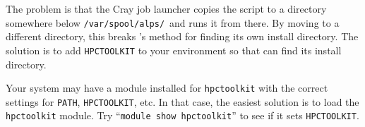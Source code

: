 The problem is that the Cray job launcher copies the \hpcrun{}
script to a directory somewhere below \verb|/var/spool/alps/|\ and runs
it from there.  By moving \hpcrun{} to a different directory, this
breaks \hpcrun{}'s method for finding its own install directory.
The solution is to add \verb|HPCTOOLKIT| to your environment so that
\hpcrun{} can find its install directory.

Your system may have a module installed for \verb|hpctoolkit| with the
correct settings for \verb|PATH|, \verb|HPCTOOLKIT|, etc.  In that case,
the easiest solution is to load the \verb|hpctoolkit| module.  Try
``\verb|module show hpctoolkit|'' to see if it sets \verb|HPCTOOLKIT|.

